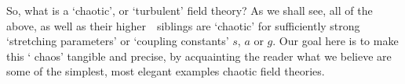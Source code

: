 So, what is a `chaotic', or `turbulent' field theory?
As we shall see, all of the above, as well as their
higher\dmn\ \spt\ siblings are `chaotic' for sufficiently strong `stretching
parameters' or `coupling constants'  ${s}$, ${a}$ or ${g}$.
Our goal here is to make this `{\spt} chaos' tangible and precise, by
acquainting the reader what we believe are
some of the simplest, most elegant examples chaotic field theories.

